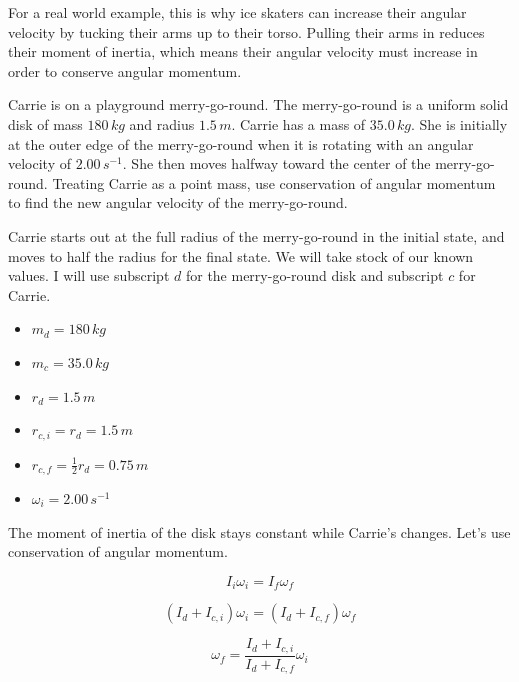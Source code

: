 \documentclass[12pt]{book}
\begin{document}
For a real world example, this is why ice skaters can increase their angular velocity by tucking their arms up to their torso. Pulling their arms in reduces their moment of inertia, which means their angular velocity must increase in order to conserve angular momentum.

\begin{exampleblock}

Carrie is on a playground merry-go-round. The merry-go-round is a uniform solid disk of mass $180 \, kg$ and radius $1.5 \, m$. Carrie has a mass of $35.0 \, kg$. She is initially at the outer edge of the merry-go-round when it is rotating with an angular velocity of $2.00 \, s^{-1}$. She then moves halfway toward the center of the merry-go-round. Treating Carrie as a point mass, use conservation of angular momentum to find the new angular velocity of the merry-go-round.

\hspace{10pt}

Carrie starts out at the full radius of the merry-go-round in the initial state, and moves to half the radius for the final state. We will take stock of our known values. I will use subscript $d$ for the merry-go-round disk and subscript $c$ for Carrie.

\begin{itemize}
\item $m_d = 180 \, kg$
\item $m_c = 35.0 \, kg$
\item $r_d = 1.5 \, m$
\item $r_{c,i} = r_d = 1.5 \, m$
\item $r_{c,f} = \frac{1}{2} r_d = 0.75 \, m$
\item $\omega_i = 2.00 \, s^{-1}$
\end{itemize}

The moment of inertia of the disk stays constant while Carrie's changes. Let's use conservation of angular momentum.

\begin{equation}
I_i \omega_i = I_f \omega_f
\end{equation}

\begin{equation}
(I_d  + I_{c,i}) \omega_i = (I_d + I_{c,f}) \omega_f
\end{equation}

\begin{equation}
\omega_f = \frac{I_d + I_{c,i}}{I_d + I_{c,f}} \omega_i
\end{equation}


\end{exampleblock}
\end{document}
